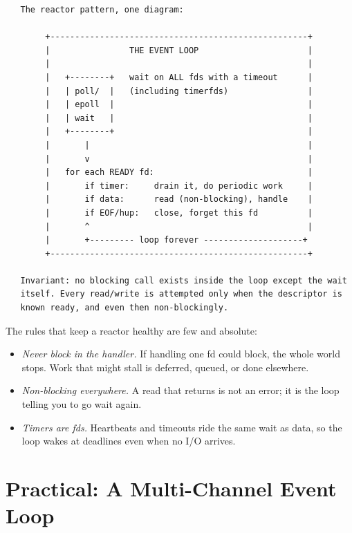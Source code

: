 \begin{verbatim}
   The reactor pattern, one diagram:

        +----------------------------------------------------+
        |                THE EVENT LOOP                      |
        |                                                    |
        |   +--------+   wait on ALL fds with a timeout      |
        |   | poll/  |   (including timerfds)                |
        |   | epoll  |                                       |
        |   | wait   |                                       |
        |   +--------+                                       |
        |       |                                            |
        |       v                                            |
        |   for each READY fd:                               |
        |       if timer:     drain it, do periodic work     |
        |       if data:      read (non-blocking), handle    |
        |       if EOF/hup:   close, forget this fd          |
        |       ^                                            |
        |       +--------- loop forever --------------------+
        +----------------------------------------------------+

   Invariant: no blocking call exists inside the loop except the wait
   itself. Every read/write is attempted only when the descriptor is
   known ready, and even then non-blockingly.
\end{verbatim}

The rules that keep a reactor healthy are few and absolute:

\begin{itemize}
  \item \emph{Never block in the handler.} If handling one fd could
    block, the whole world stops. Work that might stall is deferred,
    queued, or done elsewhere.
  \item \emph{Non-blocking everywhere.} A read that returns
     is not an error; it is the loop telling you to go
    wait again.
  \item \emph{Timers are fds.} Heartbeats and timeouts ride the same
    wait as data, so the loop wakes at deadlines even when no I/O
    arrives.
\end{itemize}

\section{Practical: A Multi-Channel Event Loop}

